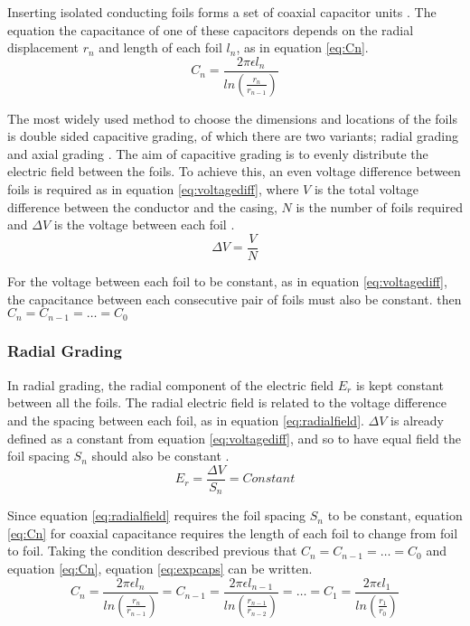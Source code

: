 Inserting isolated conducting foils forms a set of coaxial capacitor units \cite{kuffel2000high}.
The equation the capacitance of one of these capacitors depends on the radial displacement $r_n$ and length of each foil $l_n$, as in equation \ref{eq:Cn}.
\begin{equation}
   \label{eq:Cn}
   C_n = \frac{2\pi\epsilon l_{n}}{ln(\frac{r_{n}}{r_{n-1}})}
\end{equation}

The most widely used method to choose the dimensions and locations of the foils is double sided capacitive grading, of which there are two variants; radial grading and axial grading \cite{Ahmed11}.
The aim of capacitive grading is to evenly distribute the electric field between the foils.
To achieve this, an even voltage difference between foils is required as in equation \ref{eq:voltagediff}, where $V$ is the total voltage difference between the conductor and the casing, $N$ is the number of foils required and $\Delta V$ is the voltage between each foil \cite{}.
\begin{equation}
   \label{eq:voltagediff}
   \Delta V = \frac{V}{N}
\end{equation}

For the voltage between each foil to be constant, as in equation \ref{eq:voltagediff}, the capacitance between each consecutive pair of foils must also be constant. then $C_n = C_{n-1} = \dots = C_0$

\subsubsection{Radial Grading}
In radial grading, the radial component of the electric field $E_r$ is kept constant between all the foils.
The radial electric field is related to the voltage difference and the spacing between each foil, as in equation \ref{eq:radialfield}. $\Delta V$ is already defined as a constant from equation \ref{eq:voltagediff}, and so to have equal field the foil spacing $S_n$ should also be constant \cite{}. 
\begin{equation}
   \label{eq:radialfield}
   E_r = \frac{\Delta V}{S_n} = Constant
\end{equation}

Since equation \ref{eq:radialfield} requires the foil spacing $S_n$ to be constant, equation \ref{eq:Cn} for coaxial capacitance requires the length of each foil to change from foil to foil.
Taking the condition described previous that $C_n = C_{n-1} = \dots = C_0$ and equation \ref{eq:Cn}, equation \ref{eq:expcaps} can be written.
\begin{equation}
   \label{eq:expcaps}
   C_n = \frac{2\pi\epsilon l_{n}}{ln(\frac{r_{n}}{r_{n-1}})} = C_{n-1} = \frac{2\pi\epsilon l_{n-1}}{ln(\frac{r_{n-1}}{r_{n-2}})} = \dots = C_{1} = \frac{2\pi\epsilon l_{1}}{ln(\frac{r_{1}}{r_{0}})}
\end{equation}

